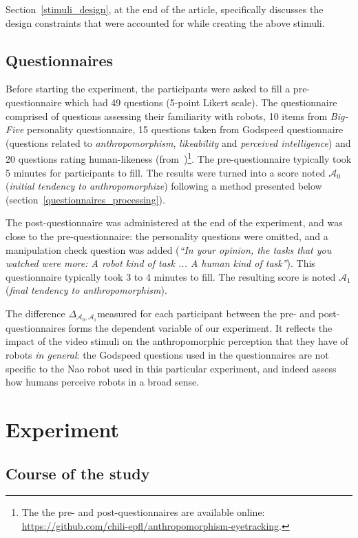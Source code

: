 \documentclass[lettersize, noapacite, twoside, HRI]{apa_HRI}
\newcommand{\anti}{{$\mathcal{A}_0$\xspace}}
\newcommand{\antf}{{$\mathcal{A}_1$\xspace}}
\newcommand{\deltaant}{{ $\Delta_{\mathcal{A}_0,\mathcal{A}_1}$\xspace}}
\begin{document}
Section~\ref{stimuli_design}, at the end of the article, specifically discusses
the design constraints that were accounted for while creating the above stimuli.

\subsection{Questionnaires}

Before starting the experiment, the participants were asked to fill a
pre-questionnaire which had 49 questions (5-point Likert scale). The
questionnaire comprised of questions assessing their familiarity with robots, 10
items from \emph{Big-Five} personality questionnaire, 15 questions taken from
Godspeed questionnaire (questions related to \emph{anthropomorphism},
\emph{likeability} and \emph{perceived intelligence}) and 20 questions rating
human-likeness (from~\cite{ruijten_introducing_2014})\footnote{The
the pre- and post-questionnaires are available online:
\url{https://github.com/chili-epfl/anthropomorphism-eyetracking}.}. The pre-questionnaire
typically took 5 minutes for participants to fill. The results were turned into
a score noted \anti (\emph{initial tendency to anthropomorphize}) following a
method presented below (section~\ref{questionnaires_processing}).

The post-questionnaire was administered at the end of the experiment, and was
close to the pre-questionnaire: the personality questions were omitted, and a
manipulation check question was added (\emph{``In your opinion, the tasks that
you watched were more: A robot kind of task ... A human kind of task''}).
This questionnaire typically took 3 to 4 minutes to fill. The resulting score is
noted \antf (\emph{final tendency to anthropomorphism}).

The difference \deltaant measured for each participant between the pre-
and post-questionnaires forms the dependent variable of our experiment. It
reflects the impact of the video stimuli on the anthropomorphic perception that
they have of robots \emph{in general}: the Godspeed questions used in the
questionnaires are not specific to the Nao robot used in this particular
experiment, and indeed assess how humans perceive robots in a broad sense.

\section{Experiment}

\subsection{Course of the study}
\end{document}
